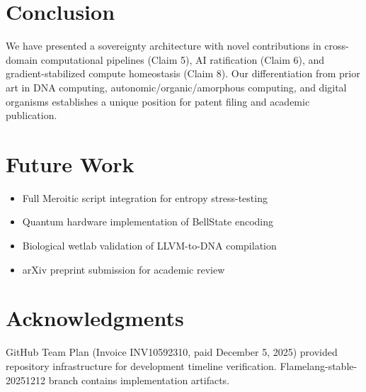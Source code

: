\documentclass[11pt,a4paper]{article}
\begin{document}
\section{Conclusion}

We have presented a sovereignty architecture with novel contributions in cross-domain computational pipelines (Claim 5), AI ratification (Claim 6), and gradient-stabilized compute homeostasis (Claim 8). Our differentiation from prior art in DNA computing, autonomic/organic/amorphous computing, and digital organisms establishes a unique position for patent filing and academic publication.

\section{Future Work}

\begin{itemize}
    \item Full Meroitic script integration for entropy stress-testing
    \item Quantum hardware implementation of BellState encoding
    \item Biological wetlab validation of LLVM-to-DNA compilation
    \item arXiv preprint submission for academic review
\end{itemize}

\section{Acknowledgments}

GitHub Team Plan (Invoice INV10592310, paid December 5, 2025) provided repository infrastructure for development timeline verification. Flamelang-stable-20251212 branch contains implementation artifacts.
\end{document}
